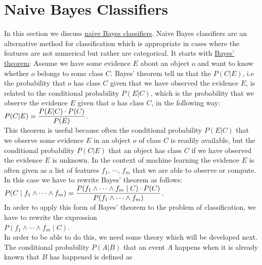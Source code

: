 \section{Naive Bayes Classifiers}
In this section we discuss \href{https://en.wikipedia.org/wiki/Naive_Bayes_classifier}{naive Bayes classifiers}.
Naive Bayes classifiers are an alternative method for classification which is appropriate in cases where the
features are not numerical but rather are categorical.  It starts with \href{https://en.wikipedia.org/wiki/Bayes%27_theorem}{Bayes' theorem}:
Assume we have some evidence $E$ about an object $o$ and want to know whether $o$ belongs to some class $C$.
Bayes' theorem tell us that the  $P(C|E)$, i.e the probability that $o$ has class $C$
given that we have observed the evidence $E$, is related to the conditional probability $P(E|C)$, which is the probability that we
observe the evidence $E$ given that $o$ has class $C$, in the following way:
\\[0.2cm]
\hspace*{1.3cm}
$\displaystyle P(C|E) = \frac{P(E|C) \cdot P(C)}{P(E)}$.
\\[0.2cm]
This theorem is useful because often the conditional probability $P(E|C)$ that we observe some evidence $E$ in an object
$o$ of class $C$ is readily available, but the conditional probability $P(C|E)$ that an object has class $C$ if
we have observed the evidence $E$ is unknown.  In the context of machine learning the evidence $E$ is often
given as a list of features $f_1$, $\cdots$, $f_m$ that we are able to observe or compute.  In this case we
have to rewrite Bayes' theorem as follows:
\\[0.2cm]
\hspace*{1.3cm}
$\displaystyle P(C\;|\;f_1 \wedge \cdots \wedge f_m) = \frac{P(f_1 \wedge \cdots \wedge f_m\;|\;C) \cdot P(C)}{P(f_1 \wedge \cdots \wedge f_m)}$.
\\[0.2cm]
In order to apply this form of Bayes' theorem to the problem of classification, we have to rewrite the expression
\\[0.2cm]
\hspace*{1.3cm}
$P(f_1 \wedge \cdots \wedge f_m\;|\;C)$.
\\[0.2cm]
In order to be able to do this, we need some theory which will be developed next.  The conditional probability
$P(A|B)$ that an event $A$ happens when it is already known that $B$ has happened is defined as 
\\[0.2cm]
\hspace*{1.3cm}

